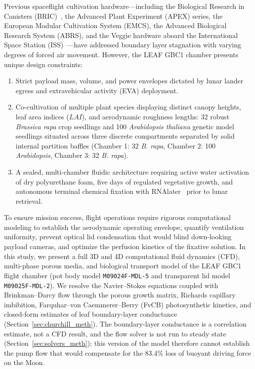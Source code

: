 \documentclass[pdflatex,sn-nature,iicol]{sn-jnl}
\begin{document}
Previous spaceflight cultivation hardware---including the Biological Research in Canisters (BRIC)~\cite{basu2017growth}, the Advanced Plant Experiment (APEX) series, the European Modular Cultivation System (EMCS), the Advanced Biological Research System (ABRS), and the Veggie hardware aboard the International Space Station (ISS)~\cite{massa2016plant,monje2020hardware}---have addressed boundary layer stagnation with varying degrees of forced air movement. However, the LEAF GBC1 chamber presents unique design constraints:
\begin{enumerate}
    \item Strict payload mass, volume, and power envelopes dictated by lunar lander egress and extravehicular activity (EVA) deployment.
    \item Co-cultivation of multiple plant species displaying distinct canopy heights, leaf area indices ($LAI$), and aerodynamic roughness lengths: 32 robust \textit{Brassica rapa} crop seedlings and 100 \textit{Arabidopsis thaliana} genetic model seedlings situated across three discrete compartments separated by solid internal partition baffles (Chamber 1: 32 \textit{B. rapa}, Chamber 2: 100 \textit{Arabidopsis}, Chamber 3: 32 \textit{B. rapa}).
    \item A sealed, multi-chamber fluidic architecture requiring active water activation of dry polyurethane foam, five days of regulated vegetative growth, and autonomous terminal chemical fixation with RNAlater~\cite{haveman2022utilizing,barker2020toast} prior to lunar retrieval.
\end{enumerate}

To ensure mission success, flight operations require rigorous computational modeling to establish the aerodynamic operating envelope, quantify ventilation uniformity, prevent optical lid condensation that would blind down-looking payload cameras, and optimize the perfusion kinetics of the fixative solution. In this study, we present a full 3D and 4D computational fluid dynamics (CFD), multi-phase porous media, and biological transport model of the LEAF GBC1 flight chamber (pot body model \texttt{M09024F-MDL-5} and transparent lid model \texttt{M09025F-MDL-2}). We resolve the Navier--Stokes equations coupled with Brinkman--Darcy flow through the porous growth matrix, Richards capillary imbibition, Farquhar--von Caemmerer--Berry (FvCB) photosynthetic kinetics, and closed-form estimates of leaf boundary-layer conductance (Section~\ref{sec:churchill_meth}). The boundary-layer conductance is a correlation estimate, not a CFD result, and the flow solver is not run to steady state (Section~\ref{sec:solvers_meth}); this version of the model therefore cannot establish the pump flow that would compensate for the 83.4\% loss of buoyant driving force on the Moon.
\end{document}
